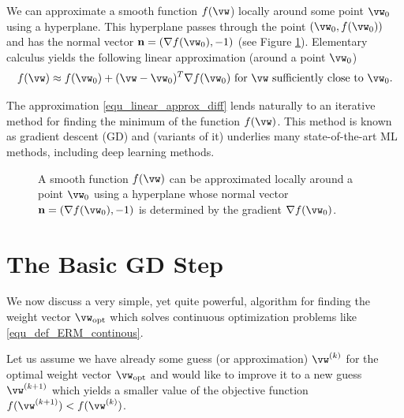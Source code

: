 \documentclass[12pt]{report}
\begin{document}
We can approximate a smooth function $f(\vw$) locally around some point $\vw_{0}$ 
using a hyperplane. This hyperplane passes through the point $(\vw_{0},f(\vw_{0}))$ and 
has the normal vector $\mathbf{n} = (\nabla f(\vw_{0}),-1)$ (see Figure \ref{fig_smooth_function}). 
Elementary calculus yields the following linear approximation (around a point $\vw_{0}$) 
\cite{RudinBookPrinciplesMatheAnalysis}
\begin{equation} 
\label{equ_linear_approx_diff}
f(\vw) \approx f(\vw_{0}) + (\vw-\vw_{0})^{T} \nabla f(\vw_{0}) \mbox{ for }\vw \mbox{ sufficiently close to } \vw_{0}.
\end{equation}  

The approximation \eqref{equ_linear_approx_diff} lends naturally to an 
iterative method for finding the minimum of the function $f(\vw)$. This 
method is known as gradient descent (GD) and (variants of it) underlies 
many state-of-the-art ML methods, including deep learning methods. 

\begin{figure}[htbp]
\begin{center}
\end{center}
\caption{A smooth function $f(\vw)$ can be approximated locally around 
	a point $\vw_{0}$ using a hyperplane whose normal vector 
	$\mathbf{n} = (\nabla f(\vw_{0}),-1)$ is determined by the 
	gradient $\nabla f(\vw_{0})$.}
\label{fig_smooth_function}
\end{figure}



\section{The Basic GD Step}
\label{sec_basic_GD_iteration}

We now discuss a very simple, yet quite powerful, algorithm for 
finding the weight vector $\vw_{\rm opt}$ which solves continuous 
optimization problems like \eqref{equ_def_ERM_continous}. 

Let us assume we have already some guess (or approximation) 
$\vw^{(k)}$ for the optimal weight vector $\vw_{\rm opt}$ and 
would like to improve it to a new guess $\vw^{(k+1)}$ which yields 
a smaller value of the objective function $f(\vw^{(k+1)}) < f(\vw^{(k)})$. 
\end{document}
